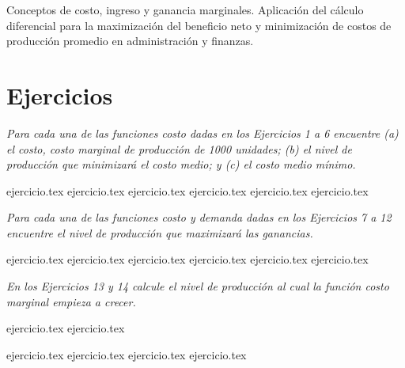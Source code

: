 
Conceptos de costo, ingreso y ganancia marginales. Aplicación del cálculo diferencial para la maximización del beneficio neto y minimización de costos de producción promedio en administración y finanzas.

\vspace{1.5em}
\section*{Ejercicios}

\noindent \textit{Para cada una de las funciones costo dadas en los Ejercicios 1 a 6 encuentre (a) el costo, costo marginal de producción de 1000 unidades; (b) el nivel de producción que minimizará el costo medio; y (c) el costo medio mínimo.}

\begin{enumerate}
    {ejercicio.tex}
    {ejercicio.tex}
    {ejercicio.tex}
    {ejercicio.tex}
    {ejercicio.tex}
    {ejercicio.tex}
\end{enumerate}

\vspace{1em}
\noindent \textit{Para cada una de las funciones costo y demanda dadas en los Ejercicios 7 a 12 encuentre el nivel de producción que maximizará las ganancias.}

\begin{enumerate}
    \setcounter{enumi}{6}
    {ejercicio.tex}
    {ejercicio.tex}
    {ejercicio.tex}
    {ejercicio.tex}
    {ejercicio.tex}
    {ejercicio.tex}
\end{enumerate}

\vspace{1em}
\noindent \textit{En los Ejercicios 13 y 14 calcule el nivel de producción al cual la función costo marginal empieza a crecer.}

\begin{enumerate}
    \setcounter{enumi}{12}
    {ejercicio.tex}
    {ejercicio.tex}
\end{enumerate}

\vspace{1em}
\begin{enumerate}
    \setcounter{enumi}{14}
    {ejercicio.tex}
    {ejercicio.tex}
    {ejercicio.tex}
    {ejercicio.tex}
\end{enumerate}
